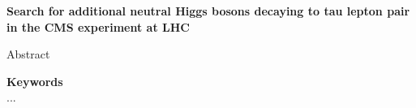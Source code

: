 \begin{center}
\LARGE
\bf
\sffamily
Search for additional neutral Higgs bosons decaying to tau lepton pair in the CMS experiment at LHC
\end{center}
\bigskip

Abstract

\vfill

\textbf{\Large Keywords}\\
...

\vfill
